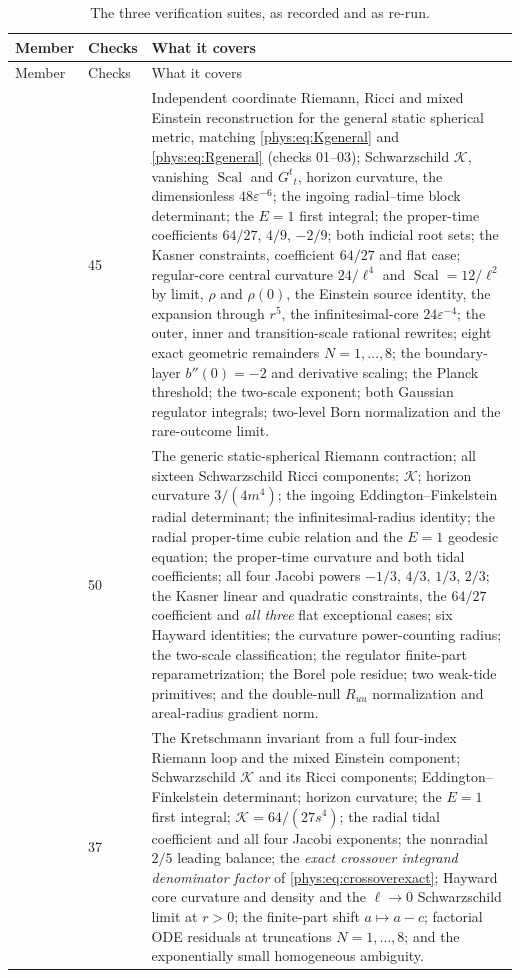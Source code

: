 \documentclass[11pt,letterpaper]{article}
\numberwithin{equation}{section}
\theoremstyle{definition}
\theoremstyle{remark}
\newcommand{\eps}{\varepsilon}
\newcommand{\Kret}{\mathcal K}
\DeclareMathOperator{\Scal}{Scal}
\begin{document}
\begin{longtable}{@{}L{0.16\textwidth}L{0.09\textwidth}L{0.68\textwidth}@{}}
\caption{The three verification suites, as recorded and as re-run.}
\label{phys:tab:suites}\\
\toprule
Member & Checks & What it covers \\
\midrule
\endfirsthead
\toprule
Member & Checks & What it covers \\
\midrule
\endhead
\bottomrule
{} & 45 &
Independent coordinate Riemann, Ricci and mixed Einstein reconstruction for the
general static spherical metric, matching \eqref{phys:eq:Kgeneral} and
\eqref{phys:eq:Rgeneral} (checks 01--03); Schwarzschild $\Kret$, vanishing
$\Scal$ and $G^{t}{}_{t}$, horizon curvature, the dimensionless
$48\eps^{-6}$; the ingoing radial--time block determinant; the $E=1$ first
integral; the proper-time coefficients $64/27$, $4/9$, $-2/9$; both indicial
root sets; the Kasner constraints, coefficient $64/27$ and flat case;
regular-core central curvature $24/\ell^{4}$ and $\Scal=12/\ell^{2}$ by limit,
$\rho$ and $\rho(0)$, the Einstein source identity, the expansion through
$r^{5}$, the infinitesimal-core $24\eps^{-4}$; the outer, inner and
transition-scale rational rewrites; eight exact geometric remainders
$N=1,\dots,8$; the boundary-layer $b''(0)=-2$ and derivative scaling; the
Planck threshold; the two-scale exponent; both Gaussian regulator integrals;
two-level Born normalization and the rare-outcome limit. \\
 & 50 &
The generic static-spherical Riemann contraction; all sixteen Schwarzschild
Ricci components; $\Kret$; horizon curvature $3/(4m^{4})$; the ingoing
Eddington--Finkelstein radial determinant; the infinitesimal-radius identity;
the radial proper-time cubic relation and the $E=1$ geodesic equation; the
proper-time curvature and both tidal coefficients; all four Jacobi powers
$-1/3$, $4/3$, $1/3$, $2/3$; the Kasner linear and quadratic constraints, the
$64/27$ coefficient and \emph{all three} flat exceptional cases; six Hayward
identities; the curvature power-counting radius; the two-scale classification;
the regulator finite-part reparametrization; the Borel pole residue; two
weak-tide primitives; and the double-null $R_{uu}$ normalization and
areal-radius gradient norm. \\
 & 37 &
The Kretschmann invariant from a full four-index Riemann loop and the mixed
Einstein component; Schwarzschild $\Kret$ and its Ricci components;
Eddington--Finkelstein determinant; horizon curvature; the $E=1$ first
integral; $\Kret=64/(27s^{4})$; the radial tidal coefficient and all four
Jacobi exponents; the nonradial $2/5$ leading balance; the \emph{exact
crossover integrand denominator factor} of
\eqref{phys:eq:crossoverexact}; Hayward core curvature and density and the
$\ell\to0$ Schwarzschild limit at $r>0$; the finite-part shift $a\mapsto a-c$;
factorial ODE residuals at truncations $N=1,\dots,8$; and the exponentially
small homogeneous ambiguity. \\
\end{longtable}
\end{document}
